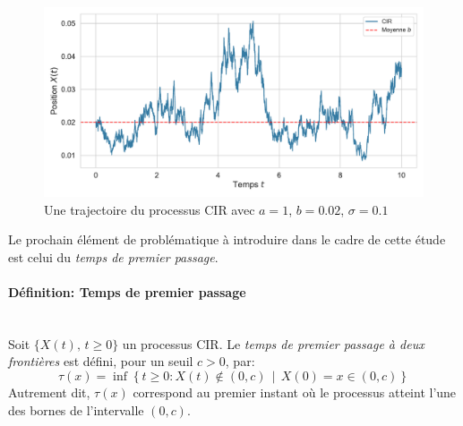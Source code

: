 \begin{figure}[htb]
    \centering
    \includegraphics[width=0.9\linewidth]{img/intro/path_cir.pdf}
    \caption{Une trajectoire du processus \acs{CIR} avec $a=1$, $b=0.02$, $\sigma=0.1$}\label{fig:TrajCIR}
\end{figure}
\FloatBarrier Le prochain élément de problématique à introduire dans le cadre de cette étude est celui du \textit{temps de premier passage}.
\paragraph{Définition: Temps de premier passage}\mbox{}\\
Soit $\{X(t),\, t \geq 0\}$ un processus \acs{CIR}. Le \textit{temps de premier passage à deux frontières} est défini, pour un seuil $c > 0$, par:
\begin{equation}\label{fpt_definition}
    \tau(x) = \inf \left\{ t \geq 0: X(t) \notin (0, c) \,\middle|\, X(0) = x \in (0, c) \right\}
\end{equation}
Autrement dit, $\tau(x)$ correspond au premier instant où le processus atteint l'une des bornes de l'intervalle $(0, c)$. 

